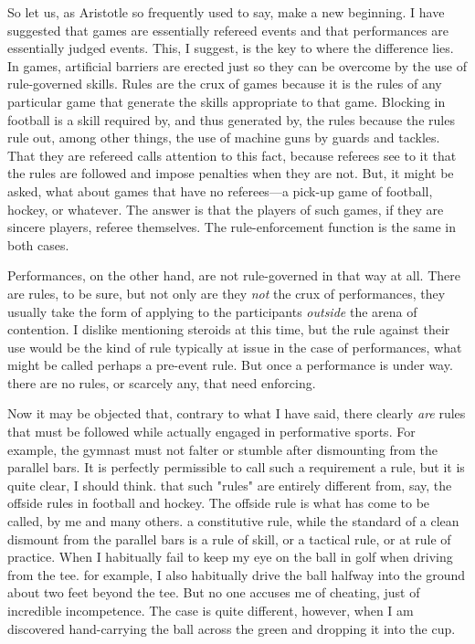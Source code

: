 \documentclass{tufte-handout}
\begin{document}
So let us, as Aristotle so frequently used to say, make a new beginning. I have suggested that games are essentially refereed events and that performances are essentially judged events. This, I suggest, is the key to where the difference lies. In games, artificial barriers are erected just so they can be overcome by the use of rule-governed skills. Rules are the crux of games because it is the rules of any particular game that generate the skills appropriate to that game. Blocking in football is a skill required by, and thus generated by, the rules because the rules rule out, among other things, the use of machine guns by guards and tackles. That they are refereed calls attention to this fact, because referees see to it that the rules are followed and impose penalties when they are not. But, it might be asked, what about games that have no referees---a pick-up game of football, hockey, or whatever. The answer is that the players of such games, if they are sincere players, referee themselves. The rule-enforcement function is the same in both cases. 

Performances, on the other hand, are not rule-governed in that way at all. There are rules, to be sure, but not only are they \textit{not} the crux of performances, they usually take the form of applying to the participants \textit{outside} the arena of contention. I dislike mentioning steroids at this time, but the rule against their use would be the kind of rule typically at issue in the case of performances, what might be called perhaps a pre-event rule. But once a performance is under way. there are no rules, or scarcely any, that need enforcing. 

Now it may be objected that, contrary to what I have said, there clearly \textit{are} rules that must be followed while actually engaged in performative sports. For example, the gymnast must not falter or stumble after dismounting from the parallel bars. It is perfectly permissible to call such a requirement a rule, but it is quite clear, I should think. that such "rules" are entirely different from, say, the offside rules in football and hockey. The offside rule is what has come to be called, by me and many others. a constitutive rule, while the standard of a clean dismount from the parallel bars is a rule of skill, or a tactical rule, or at rule of practice. When I habitually fail to keep my eye on the ball in golf when driving from the tee. for example, I also habitually drive the ball halfway into the ground about two feet beyond the tee. But no one accuses me of cheating, just of incredible incompetence. The case is quite different, however, when I am discovered hand-carrying the ball across the green and dropping it into the cup.
\end{document}
